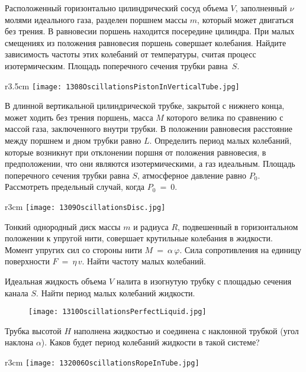 \AddProb Расположенный горизонтально цилиндрический сосуд объема $V$, заполненный $\nu$ молями идеального газа, 
разделен поршнем массы $m$, который может двигаться без трения. В равновесии поршень находится посередине цилиндра. 
При малых смещениях из положения равновесия поршень совершает колебания. Найдите зависимость частоты этих колебаний от температуры, 
считая процесс изотермическим. Площадь поперечного сечения трубки равна~$S$.

\begin{wrapfigure}{r}{3.5cm}
\texttt{[image: 1308OscillationsPistonInVerticalTube.jpg]}
\end{wrapfigure}

\AddProb В длинной вертикальной цилиндрической трубке, закрытой с нижнего конца, может ходить без трения поршень, 
масса $M$ которого велика по сравнению с массой газа, заключенного внутри трубки. В положении равновесия расстояние между поршнем и дном трубки равно $L$. 
Определить период малых колебаний, которые возникнут при отклонении поршня от положения равновесия, в предположении, что они являются изотермическими, 
а газ идеальным. Площадь поперечного сечения трубки равна $S$, атмосферное давление равно $P_0$. Рассмотреть предельный случай, когда $P_0$~=~0.

\begin{wrapfigure}{r}{3cm}
\texttt{[image: 1309OscillationsDisc.jpg]}
\end{wrapfigure}

\AddProb Тонкий однородный диск массы $m$ и радиуса $R$, подвешенный в горизонтальном положении к упругой нити, совершает крутильные колебания в жидкости. 
Момент упругих сил со стороны нити $M~=~\alpha\,\varphi$.  Сила сопротивления на единицу поверхности $F~=~\eta\,v$. Найти частоту малых колебаний.

\AddProb Идеальная жидкость объема $V$ налита в изогнутую трубку с площадью сечения канала $S$. Найти период малых колебаний жидкости.

\begin{figure}[!h]
\texttt{[image: 1310OscillationsPerfectLiquid.jpg]}
\end{figure}

\AddProb Трубка высотой $H$ наполнена жидкостью и соединена с наклонной трубкой (угол наклона $\alpha$). 
Каков будет период колебаний жидкости в такой системе?

\begin{wrapfigure}{r}{3cm}
\texttt{[image: 132006OscillationsRopeInTube.jpg]}
\end{wrapfigure}

